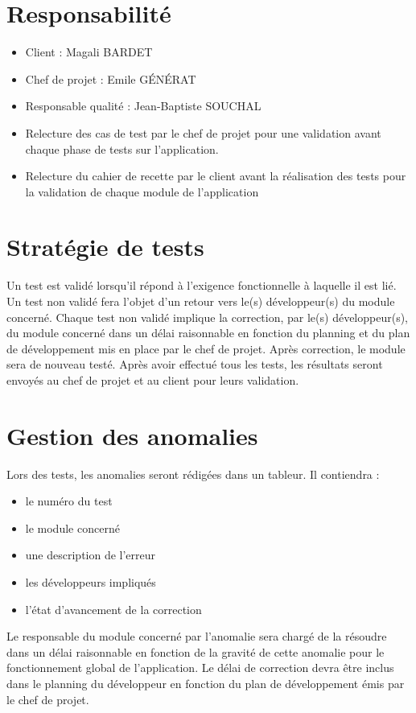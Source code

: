 \documentclass[a4paper,11pt,french]{article}
\begin{document}
\section{Responsabilité}

\begin{itemize}
  \item Client : Magali BARDET
  \item Chef de projet : Emile GÉNÉRAT
  \item Responsable qualité : Jean-Baptiste SOUCHAL
  \item Relecture des cas de test par le chef de projet pour une validation avant chaque phase de tests sur l'application.
  \item Relecture du cahier de recette par le client avant la réalisation des tests pour la validation de chaque module de l'application
\end{itemize}

\section{Stratégie de tests}
Un test est validé lorsqu’il répond à l’exigence fonctionnelle à laquelle il est lié.
Un test non validé fera l’objet d’un retour vers le(s) développeur(s) du module concerné.
Chaque test non validé implique la correction, par le(s) développeur(s), du module concerné dans
un délai raisonnable en fonction du planning et du plan de développement mis en place par le chef de
projet. Après correction, le module sera de nouveau testé. Après avoir effectué tous les tests, les
résultats seront envoyés au chef de projet et au client pour leurs validation.

\section{Gestion des anomalies}
Lors des tests, les anomalies seront rédigées dans un tableur. Il contiendra :

\begin{itemize}
  \item le numéro du test
  \item le module concerné
  \item une description de l'erreur
  \item les développeurs impliqués
  \item l’état d’avancement de la correction
\end{itemize}

Le responsable du module concerné par l’anomalie sera chargé de la résoudre dans un
  délai raisonnable en fonction de la gravité de cette anomalie pour le fonctionnement global
  de l’application. Le délai de correction devra être inclus dans le planning du développeur en fonction
  du plan de développement émis par le chef de projet.
\newpage
\end{document}
